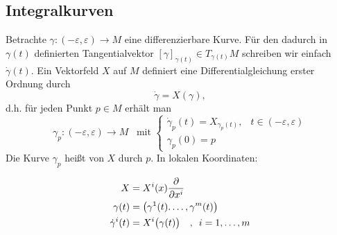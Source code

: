 \subsection{Integralkurven} %
\label{sub:22}
Betrachte $\gamma : ({-\varepsilon}, \varepsilon) \to M$ eine differenzierbare Kurve. Für den dadurch in $\gamma(t)$ definierten Tangentialvektor 
$[\gamma]_{\gamma(t)} \in T_{\gamma(t)}M$ schreiben wir einfach $\dot \gamma(t)$. Ein Vektorfeld $X$ auf $M$ definiert eine Differentialgleichung erster Ordnung durch
\[
	\dot \gamma = X(\gamma),
\]
d.h. für jeden Punkt $p \in M$ erhält man 
\[
	\gamma_p : ({-\varepsilon, \varepsilon}) \to M \enspace \text{ mit } \begin{cases}
		\dot \gamma_p (t) = X_{\gamma_p(t)}, &t \in (-\varepsilon, \varepsilon)\\
		\gamma_p(0) = p
	\end{cases}
\]
Die Kurve $\gamma_p$ heißt  von $X$ durch $p$. In lokalen Koordinaten: \smallskip\\
\begin{minipage}[c]{0.4\textwidth}
	\begin{align*}
		X &= X^i(x) \diff{}{x^i} \\
		\gamma(t) &= \enbrace*{\gamma^1(t). \ldots , \gamma^m(t)} \\
		{\dot{\gamma}}^i (t) &= X^i \enbrace[\big]{\gamma(t)} \quad ,\enspace i=1,\ldots ,m 
	\end{align*}
\end{minipage}
\begin{minipage}[c]{0.55\textwidth}
	\captionsetup{type=figure, skip=2pt}
\end{minipage}
\newpage
